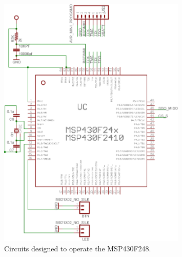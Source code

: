 \begin{figure}
\begin{center}
\includegraphics[width=0.8\textwidth]{images/MSP430CKT.eps}
\caption{Circuits designed to operate the MSP430F248.}
\label{Fig:MSP430CKT}
\end{center}
\end{figure}

